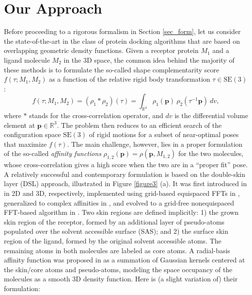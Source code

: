 \documentclass[article]{gmp2014}
\theoremstyle{definition}
\begin{document}
\section{Our Approach} \label{sec_method}

Before proceeding to a rigorous formalism in Section \ref{sec_form}, let us consider the state-of-the-art in the class of protein docking algorithms that are based on overlapping geometric density functions. Given a receptor protein $M_1$ and a ligand molecule $M_2$ in the 3D space, the common idea behind the majority of these methods is to formulate the so-called shape complementarity score $f(\tau; M_1, M_2)$ as a function of the relative rigid body transformation $\tau \in \mathrm{SE}(3)$:
%
\begin{equation}
    f(\tau; M_1, M_2) = (\rho_1 \ast \rho_2) (\tau) = \int_{\mathds{R}^3} \rho_1(\mathbf{p})~\rho_2(\tau^{-1}\mathbf{p})~ dv, \label{eq_method_1}
\end{equation}
%
where $\ast$ stands for the cross-correlation operator, and $dv$ is the differential volume element at $\mathbf{p} \in \mathds{R}^3$. The problem then reduces to an efficient search of the configuration space $\mathrm{SE}(3)$ of rigid motions for a subset of near-optimal poses that maximize $f(\tau)$.
%
The main challenge, however, lies in a proper formulation of the so-called {\it affinity functions} $\rho_{1,2}(\mathbf{p}) = \rho(\mathbf{p}, M_{1,2})$ for the two molecules, whose cross-correlation gives a high score when the two are in a ``proper fit'' pose.
%
A relatively successful and contemporary formulation is based on the double-skin layer (DSL) approach, illustrated in Figure \ref{figure3} (a). It was first introduced in \cite{Connolly1986,Wang1991} in 2D and 3D, respectively, implemented using grid-based equispaced FFTs in \cite{Katchalski1992}, generalized to complex affinities in \cite{Chen2003b}, and evolved to a grid-free nonequispaced FFT-based algorithm in \cite{Candas2005,Bajaj2011}.
%
Two skin regions are defined implicitly: 1) the grown skin region of the receptor, formed by an additional layer of pseudo-atoms populated over the solvent accessible surface (SAS); and 2) the surface skin region of the ligand, formed by the original solvent accessible atoms.
%
The remaining atoms in both molecules are labeled as core atoms. A radial-basis affinity function was proposed in \cite{Candas2005,Bajaj2011} as a summation of Gaussian kernels centered at the skin/core atoms and pseudo-atoms, modeling the space occupancy of the molecules as a smooth 3D density function. Here is (a slight variation of) their formulation:
\end{document}
